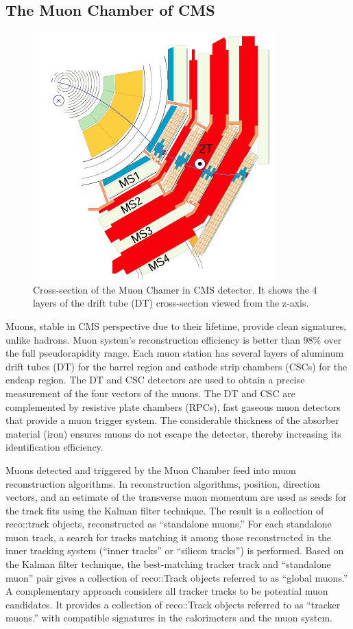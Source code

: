 \subsection{The Muon Chamber of CMS}
\begin{figure}[h!]
	\caption{Cross-section of the Muon Chamer in CMS detector. It shows the 4 layers of the drift tube (DT) cross-section viewed from the z-axis. \cite{det}}
  \label{fig:MC}
  \centering
  \includegraphics[width=0.4\linewidth]{figs/MCcms.png}
\end{figure}

Muons, stable in CMS perspective due to their lifetime, provide clean signatures, unlike hadrons.
Muon system's reconstruction efficiency is better than 98\% over the full pseudorapidity range.
Each muon station has several layers of aluminum drift tubes (DT) for the barrel region and cathode strip chambers (CSCs) for the endcap region.
The DT and CSC detectors are used to obtain a precise measurement of the four vectors of the muons.
The DT and CSC are complemented by resistive plate chambers (RPCs), fast gaseous muon detectors that provide a muon trigger system.
The considerable thickness of the absorber material (iron) ensures muons do not escape the detector, thereby increasing its identification efficiency.

Muons detected and triggered by the Muon Chamber feed into muon reconstruction algorithms.
In reconstruction algorithms, position, direction vectors, and an estimate of the transverse muon momentum are used as seeds for the track fits using the Kalman filter technique.
The result is a collection of reco::track objects, reconstructed as ``standalone muons.''
For each standalone muon track, a search for tracks matching it among those reconstructed in the inner tracking system (``inner tracks'' or ``silicon tracks'')  is performed.
Based on the Kalman filter technique, the best-matching tracker track and ``standalone muon'' pair gives a collection of reco::Track objects referred to as ``global muons.''
A complementary approach considers all tracker tracks to be potential muon candidates. 
It provides a collection of reco::Track objects referred to as ``tracker muons.''  with compatible signatures in the calorimeters and the muon system.

